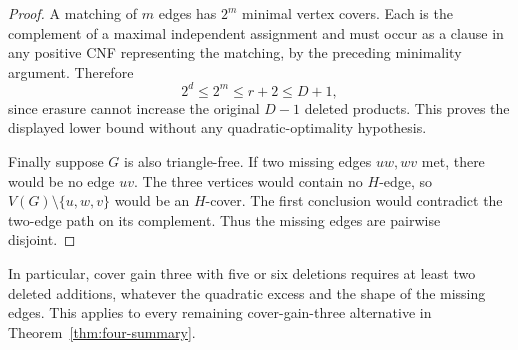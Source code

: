 \begin{proof}
A matching of $m$ edges has $2^m$ minimal vertex covers. Each is the complement of a maximal independent assignment and must occur as a clause in any positive CNF representing the matching, by the preceding minimality argument. Therefore
\[
 2^d\le2^m\le r+2\le D+1,
\]
since erasure cannot increase the original $D-1$ deleted products. This proves the displayed lower bound without any quadratic-optimality hypothesis.

Finally suppose $G$ is also triangle-free. If two missing edges $uw,wv$ met, there would be no edge $uv$. The three vertices would contain no $H$-edge, so $V(G)\setminus\{u,w,v\}$ would be an $H$-cover. The first conclusion would contradict the two-edge path on its complement. Thus the missing edges are pairwise disjoint.
\end{proof}

In particular, cover gain three with five or six deletions requires at least two deleted additions, whatever the quadratic excess and the shape of the missing edges. This applies to every remaining cover-gain-three alternative in Theorem~\ref{thm:four-summary}.

